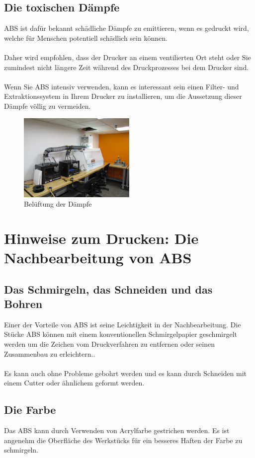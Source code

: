 \documentclass[11pt,a4paper]{article}
\begin{document}
	\subsection{Die toxischen Dämpfe}ABS ist dafür bekannt schädliche Dämpfe zu emittieren, wenn es gedruckt wird, welche für Menschen potentiell schädlich sein können.
\\\\
Daher wird empfohlen, dass der Drucker an einem ventilierten Ort steht oder Sie zumindest nicht längere Zeit während des Druckprozesses bei dem Drucker sind.
\\\\
Wenn Sie ABS intensiv verwenden, kann es interessant sein einen Filter- und Extraktionssystem in Ihrem Drucker zu installieren, um die Aussetzung dieser Dämpfe völlig zu vermeiden. 
\begin{figure}[H]
\centering
\includegraphics[width=0.5\textwidth,cfbox=azul_marcos 4pt 0pt]{FOTOS/VENTILACIONVAPORES}
\caption*{Belüftung der Dämpfe}
\end{figure}
\section{Hinweise zum Drucken: Die Nachbearbeitung von ABS }
	\subsection{Das Schmirgeln, das Schneiden und das Bohren }Einer der Vorteile von ABS ist seine Leichtigkeit in der Nachbearbeitung. Die Stücke ABS können mit einem konventionellen Schmirgelpapier geschmirgelt werden um die Zeichen vom Druckverfahren zu entfernen oder seinen Zusammenbau zu erleichtern..
\\\\
Es kann auch ohne Probleme gebohrt werden und es kann durch Schneiden mit einem Cutter oder ähnlichem geformt werden.
	\subsection{Die Farbe}Das ABS kann durch Verwenden von Acrylfarbe gestrichen werden. Es ist angenehm die Oberfläche des Werkstücks für ein besseres Haften der Farbe zu schmirgeln.
\end{document}
